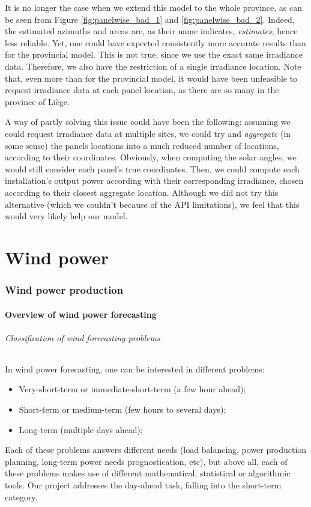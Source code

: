 \documentclass[a4paper, 12pt]{article}
\begin{document}
It is no longer the case when we extend this model to the whole province, as can be seen from Figure \ref{fig:panelwise_bad_1} and \ref{fig:panelwise_bad_2}. Indeed, the estimated azimuths and areas are, as their name indicates, \emph{estimates}; hence less reliable. Yet, one could have expected consistently more accurate results than for the provincial model. This is not true, since we use the exact same irradiance data. Therefore, we also have the restriction of a single irradiance location. Note that, even more than for the provincial model, it would have been unfeasible to request irradiance data at each panel location, as there are so many in the province of Liège.

A way of partly solving this issue could have been the following: assuming we could request irradiance data at multiple sites, we could try and \emph{aggregate} (in some sense) the panels locations into a much reduced number of locations, according to their coordinates. Obviously, when computing the solar angles, we would still consider each panel's true coordinates. Then, we could compute each installation's output power according with their corresponding irradiance, chosen according to their closest aggregate location. Although we did not try this alternative (which we couldn't because of the API limitations), we feel that this would very likely help our model.

\newpage
\part{Wind power}

\section{Wind power production}
\label{sec:wind_power}

\subsection{Overview of wind power forecasting}

	\paragraph{Classification of wind forecasting problems}

	In wind power forecasting, one can be interested in different problems:
	\begin{itemize}
		\item Very-short-term or immediate-short-term (a few hour ahead);
		\item Short-term or medium-term (few hours to several days);
		\item Long-term (multiple days ahead);
	\end{itemize}
	Each of these problems answers different needs (load balancing, power production planning, long-term power needs prognostication, etc), but above all, each of these problems makes use of different mathematical, statistical or algorithmic tools. Our project addresses the day-ahead task, falling into the short-term category.
\end{document}
